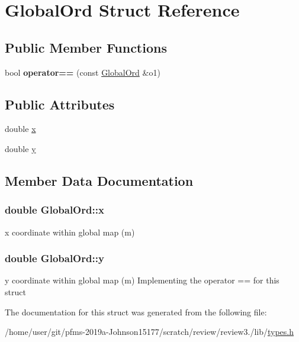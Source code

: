 \hypertarget{structGlobalOrd}{}\section{Global\+Ord Struct Reference}
\label{structGlobalOrd}
\subsection*{Public Member Functions}
\begin{DoxyCompactItemize}
\item 
bool {\bfseries operator==} (const \hyperlink{structGlobalOrd}{Global\+Ord} \&o1)\hypertarget{structGlobalOrd_a58aa85821a795e025b0e72463dec2bbb}{}\label{structGlobalOrd_a58aa85821a795e025b0e72463dec2bbb}

\end{DoxyCompactItemize}
\subsection*{Public Attributes}
\begin{DoxyCompactItemize}
\item 
double \hyperlink{structGlobalOrd_a59539a3081973edb2ec3789f71943923}{x}
\item 
double \hyperlink{structGlobalOrd_af9f9e1597f7373a92ce693c10acec8a5}{y}
\end{DoxyCompactItemize}


\subsection{Member Data Documentation}
\subsubsection[{\texorpdfstring{x}{x}}]{\setlength{\rightskip}{0pt plus 5cm}double Global\+Ord\+::x}\hypertarget{structGlobalOrd_a59539a3081973edb2ec3789f71943923}{}\label{structGlobalOrd_a59539a3081973edb2ec3789f71943923}
x coordinate within global map (m) 
\subsubsection[{\texorpdfstring{y}{y}}]{\setlength{\rightskip}{0pt plus 5cm}double Global\+Ord\+::y}\hypertarget{structGlobalOrd_af9f9e1597f7373a92ce693c10acec8a5}{}\label{structGlobalOrd_af9f9e1597f7373a92ce693c10acec8a5}
y coordinate within global map (m) Implementing the operator \textquotesingle{}==\textquotesingle{} for this struct 

The documentation for this struct was generated from the following file\+:\begin{DoxyCompactItemize}
\item 
/home/user/git/pfms-\/2019a-\/\+Johnson15177/scratch/review/review3./lib/\hyperlink{types_8h}{types.\+h}\end{DoxyCompactItemize}
